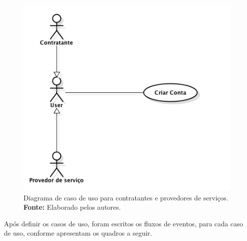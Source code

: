 \begin{figure}[h!]
	\centerline{\includegraphics[scale=0.6]{./imagens/caso-de-uso-usuario.png}}
	\caption[Diagrama de caso de uso para contratantes e provedores de serviços]
	{Diagrama de caso de uso para contratantes e provedores de serviços. \textbf{Fonte:} Elaborado pelos autores.}
	\label{fig:caso_uso_usuario_inicial}
\end{figure}

\par Após definir os casos de uso, foram escritos os fluxos de eventos, para cada caso de uso, conforme apresentam os quadros a seguir.

%	

%	

